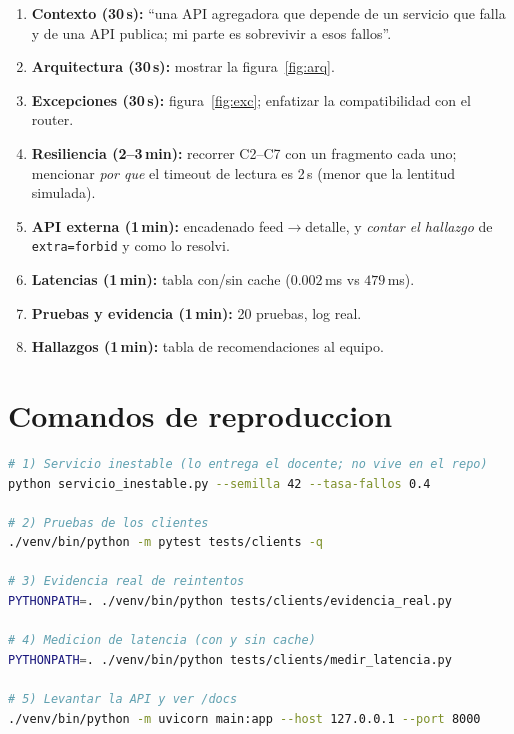 \documentclass[11pt,a4paper]{article}
\newcommand{\arch}[1]{\texttt{#1}}
\newcommand{\quot}{\textquotedbl}
\begin{document}
\begin{enumerate}
  \item \textbf{Contexto (30\,s):} ``una API agregadora que depende de un
        servicio que falla y de una API publica; mi parte es sobrevivir a
        esos fallos''.
  \item \textbf{Arquitectura (30\,s):} mostrar la figura~\ref{fig:arq}.
  \item \textbf{Excepciones (30\,s):} figura~\ref{fig:exc}; enfatizar la
        compatibilidad con el router.
  \item \textbf{Resiliencia (2--3\,min):} recorrer C2--C7 con un fragmento
        cada uno; mencionar \emph{por que} el timeout de lectura es 2\,s
        (menor que la lentitud simulada).
  \item \textbf{API externa (1\,min):} encadenado feed$\to$detalle, y
        \emph{contar el hallazgo} de \arch{extra=\quot forbid\quot} y como lo resolvi.
  \item \textbf{Latencias (1\,min):} tabla con/sin cache
        ($0.002$\,ms vs $479$\,ms).
  \item \textbf{Pruebas y evidencia (1\,min):} 20 pruebas, log real.
  \item \textbf{Hallazgos (1\,min):} tabla de recomendaciones al equipo.
\end{enumerate}

\section{Comandos de reproduccion}
\begin{lstlisting}[language=bash, caption={Como reproducir todo}]
# 1) Servicio inestable (lo entrega el docente; no vive en el repo)
python servicio_inestable.py --semilla 42 --tasa-fallos 0.4

# 2) Pruebas de los clientes
./venv/bin/python -m pytest tests/clients -q

# 3) Evidencia real de reintentos
PYTHONPATH=. ./venv/bin/python tests/clients/evidencia_real.py

# 4) Medicion de latencia (con y sin cache)
PYTHONPATH=. ./venv/bin/python tests/clients/medir_latencia.py

# 5) Levantar la API y ver /docs
./venv/bin/python -m uvicorn main:app --host 127.0.0.1 --port 8000
\end{lstlisting}
\end{document}
